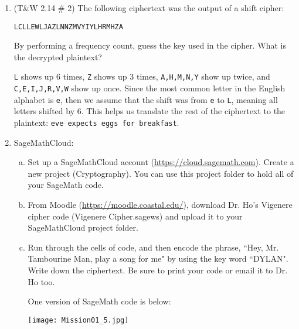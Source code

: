 \documentclass[12pt]{amsart}
\theoremstyle{plain}
\theoremstyle{definition}
\begin{document}
\begin{enumerate}[1.]
\begin{enumerate}[a.]
		\end{enumerate}
		\item (T\&W 2.14 \# 2)  The following ciphertext was the output of a shift cipher:
		\begin{center}
			\texttt{LCLLEWLJAZLNNZMVYIYLHRMHZA}
		\end{center}
		By performing a frequency count, guess the key used in the cipher.  What is the decrypted plaintext?\\ \begin{framed}\texttt{L} shows up 6 times, \texttt{Z} shows up 3 times, \texttt{A,H,M,N,Y} show up twice, and \texttt{C,E,I,J,R,V,W} show up once.  Since the most common letter in the English alphabet is \texttt{e}, then we assume that the shift was from \texttt{e} to \texttt{L}, meaning all letters shifted by 6.  This helps us translate the rest of the ciphertext to the plaintext: \texttt{eve expects eggs for breakfast}. \end{framed}
	\item SageMathCloud:\\
		\begin{enumerate}[a.]
			\item Set up a SageMathCloud account (\url{https://cloud.sagemath.com}).  Create a new project (Cryptography).  You can use this project folder to hold all of your SageMath code.  \\
			\item From Moodle (\url{https://moodle.coastal.edu/}), download Dr. Ho's Vigenere cipher code (Vigenere Cipher.sagews) and upload it to your SageMathCloud project folder.\\
			\item Run through the cells of code, and then encode the phrase, ``Hey, Mr. Tambourine Man, play a song for me" by using the key word ``DYLAN".  Write down the ciphertext.  Be sure to print your code or email it to Dr. Ho too.\\ \begin{framed}One version of SageMath code is below:
	\begin{framed}\begin{center}
	\texttt{[image: Mission01\_5.jpg]}
	\end{center}\end{framed}
	\end{framed}
		\end{enumerate}
\end{enumerate}

	
\end{document}
